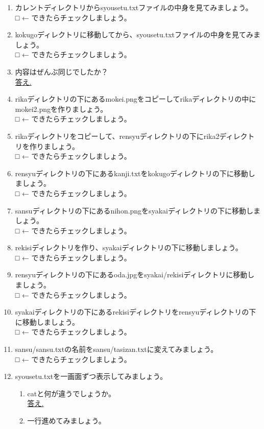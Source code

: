 \begin{tcolorbox}[title=\useOmetoi,breakable]
\begin{enumerate}
\item カレントディレクトリからsyousetu.txtファイルの中身を見てみましょう。\\
□ ← できたらチェックしましょう。
\item kokugoディレクトリに移動してから、syousetu.txtファイルの中身を見てみましょう。\\
□ ← できたらチェックしましょう。
\item 内容はぜんぶ同じでしたか？\\
\underline{答え.\hspace{0.8\linewidth}}
\item rikaディレクトリの下にあるmokei.pngをコピーしてrikaディレクトリの中にmokei2.pngを作りましょう。\\
□ ← できたらチェックしましょう。
\item rikaディレクトリをコピーして、rensyuディレクトリの下にrika2ディレクトリを作りましょう。\\
□ ← できたらチェックしましょう。
\item rensyuディレクトリの下にあるkanji.txtをkokugoディレクトリの下に移動しましょう。\\
□ ← できたらチェックしましょう。
\item sansuディレクトリの下にあるnihon.pngをsyakaiディレクトリの下に移動しましょう。\\
□ ← できたらチェックしましょう。
\item rekisiディレクトリを作り、syakaiディレクトリの下に移動しましょう。\\
□ ← できたらチェックしましょう。
\item rensyuディレクトリの下にあるoda.jpgをsyakai/rekisiディレクトリに移動しましょう。\\
□ ← できたらチェックしましょう。
\item syakaiディレクトリの下にあるrekisiディレクトリをrensyuディレクトリの下に移動しましょう。\\
□ ← できたらチェックしましょう。
\item sansu/sansu.txtの名前をsansu/tasizan.txtに変えてみましょう。\\
□ ← できたらチェックしましょう。
\item syousetu.txtを一画面ずつ表示してみましょう。
	\begin{enumerate}
	\item catと何が違うでしょうか。\\
	\underline{答え.\hspace{0.8\linewidth}}
	\item 一行進めてみましょう。

\end{enumerate}
\end{enumerate}
\end{tcolorbox}
